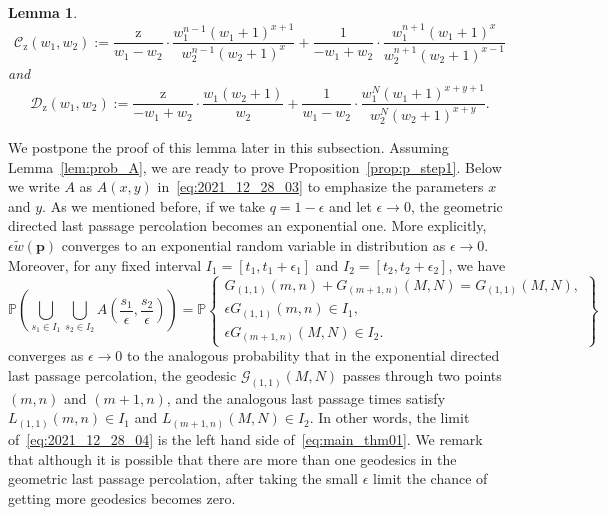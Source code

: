 \documentclass{article}
\newtheorem{lm}[thm]{Lemma}
\numberwithin{equation}{section}
\newcommand{\gd}{{\mathcal{G}}}
\newcommand{\prob}{\mathbb{P}}
\newcommand{\rz}{\mathrm{z}}
\begin{document}
\begin{lm}
\begin{equation}
	\mathcal{C}_\rz(w_1,w_2):= \frac{\rz}{w_1-w_2}\cdot \frac{w_1^{n-1}(w_1+1)^{x+1}}{w_2^{n-1}(w_2+1)^x}
	+\frac{1}{-w_1+ w_2}\cdot \frac{w_1^{n+1} (w_1+1)^{x}}
	{w_2^{n+1} (w_2+1)^{x-1}}
\end{equation}
and
\begin{equation}
\mathcal{D}_\rz(w_1,w_2):= \frac{\rz}{-w_1+w_2}\cdot \frac{w_1(w_2+1)}{w_2}
+\frac{1}{w_1- w_2}\cdot \frac{w_1^N (w_1+1)^{x+y+1}}
{w_2^N (w_2+1)^{x+y}}.
\end{equation}
\end{lm}

We postpone the proof of this lemma later in this subsection. Assuming Lemma~\ref{lem:prob_A}, we are ready to prove Proposition~\ref{prop:p_step1}. Below we write $A$ as $A(x,y)$ in~\eqref{eq:2021_12_28_03} to emphasize the parameters $x$ and $y$. As we mentioned before, if we take $q=1-\epsilon$ and let $\epsilon\to 0$, the geometric directed last passage percolation becomes an exponential one. More explicitly, $\epsilon \tilde w(\mathbf{p})$ converges to an exponential random variable in distribution as $\epsilon\to 0$. Moreover, for any fixed interval $I_1=[t_1,t_1+\epsilon_1]$ and $I_2=[t_2,t_2+\epsilon_2]$, we have
\begin{equation}
	\label{eq:2021_12_28_04}
	\prob\left(\bigcup_{s_1\in I_1}\bigcup_{s_2\in I_2}  A\left(\frac{s_1}{\epsilon},\frac{s_2}{\epsilon}\right)\right)
	=\prob\left\{
	\begin{array}{l}
		G_{(1,1)}(m,n)+G_{(m+1,n)}(M,N) = G_{(1,1)} (M,N),\\
		\epsilon G_{(1,1)}(m,n)\in I_1,\\
		\epsilon G_{(m+1,n)}(M,N) \in I_2.
	\end{array}
	\right\}
\end{equation}
converges as $\epsilon\to 0$ to the analogous probability that in the exponential directed last passage percolation, the geodesic $\gd_{(1,1)}(M,N)$ passes through two points $(m,n)$ and $(m+1,n)$, and the analogous last passage times satisfy $L_{(1,1)}(m,n)\in I_1$ and $L_{(m+1,n)}(M,N)\in I_2$. In other words, the limit of~\eqref{eq:2021_12_28_04} is the left hand side of~\eqref{eq:main_thm01}. We remark that although it is possible that there are more than one geodesics in the geometric last passage percolation, after taking the small $\epsilon$ limit the chance of getting more geodesics becomes zero. 
\end{document}
